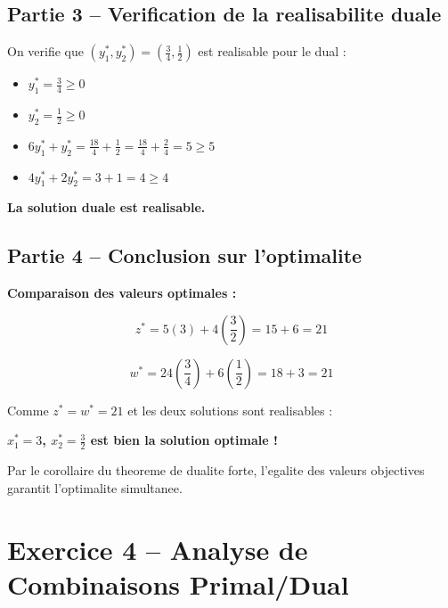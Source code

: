 \documentclass[12pt,a4paper]{article}
\begin{document}
\subsection{Partie 3 -- Verification de la realisabilite duale}

\begin{correction}
On verifie que $(y_1^*, y_2^*) = (\frac{3}{4}, \frac{1}{2})$ est realisable pour le dual :

\begin{itemize}
    \item $y_1^* = \frac{3}{4} \geq 0$ \checkmark
    \item $y_2^* = \frac{1}{2} \geq 0$ \checkmark
    \item $6y_1^* + y_2^* = \frac{18}{4} + \frac{1}{2} = \frac{18}{4} + \frac{2}{4} = 5 \geq 5$ \checkmark
    \item $4y_1^* + 2y_2^* = 3 + 1 = 4 \geq 4$ \checkmark
\end{itemize}

\textbf{La solution duale est realisable.} 
\end{correction}

\subsection{Partie 4 -- Conclusion sur l'optimalite}

\begin{correction}
\textbf{Comparaison des valeurs optimales :}

$$z^* = 5(3) + 4\left(\frac{3}{2}\right) = 15 + 6 = 21$$

$$w^* = 24\left(\frac{3}{4}\right) + 6\left(\frac{1}{2}\right) = 18 + 3 = 21$$

Comme $z^* = w^* = 21$ et les deux solutions sont realisables :

\begin{center}
\textcolor{defvert}{\Large\textbf{$x_1^* = 3$, $x_2^* = \frac{3}{2}$ est bien la solution optimale !}}
\end{center}

Par le corollaire du theoreme de dualite forte, l'egalite des valeurs objectives garantit l'optimalite simultanee.
\end{correction}

\newpage
\section{Exercice 4 -- Analyse de Combinaisons Primal/Dual}
\end{document}
